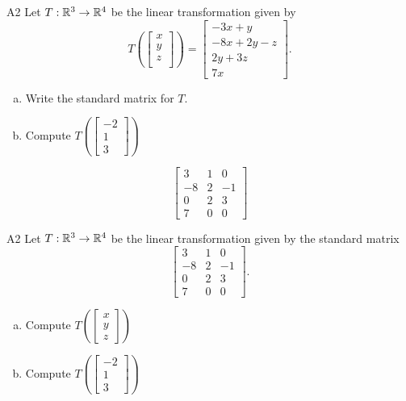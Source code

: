 \begin{problem}{A2}
Let $T: \mathbb{R}^3\rightarrow \mathbb{R}^4$ be the linear transformation given by $$T\left(\begin{bmatrix} x \\ y \\ z \\  \end{bmatrix} \right) = \begin{bmatrix} -3x+y \\ -8x+2y-z \\ 2y+3z \\ 7x \end{bmatrix}.$$
\begin{enumerate}[(a)]
\item Write the standard matrix for $T$.
\item Compute \( T\left( \begin{bmatrix}-2 \\ 1 \\ 3 \end{bmatrix} \right) \)
\end{enumerate}
\end{problem}
\begin{solution}
$$\begin{bmatrix} 3 & 1 & 0 \\ -8 & 2 & -1 \\ 0 & 2 & 3 \\ 7 & 0 & 0 \end{bmatrix}$$
\end{solution}

\begin{problem}{A2}
Let $T: \mathbb{R}^3\rightarrow \mathbb{R}^4$ be the linear transformation given by the standard matrix
$$\begin{bmatrix} 3 & 1 & 0 \\ -8 & 2 & -1 \\ 0 & 2 & 3 \\ 7 & 0 & 0 \end{bmatrix}.$$
\begin{enumerate}[(a)]
\item Compute \( T\left( \begin{bmatrix}x\\ y \\ z \end{bmatrix} \right) \)
\item Compute \( T\left( \begin{bmatrix}-2 \\ 1 \\ 3 \end{bmatrix} \right) \)
\end{enumerate}
\end{problem}

